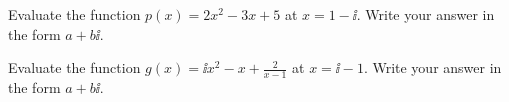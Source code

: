 \begin{exercise}
	Evaluate the function $p(x)=2x^2-3x+5$ at $x=1-\ii$.
	Write your answer in the form $a+b\ii$.
\end{exercise}

\vfill
\begin{center} \hfill
\end{center}

\begin{exercise}
	Evaluate the function $g(x)=\ii x^2-x+\frac{2}{x-1}$ at $x=\ii-1$.
	Write your answer in the form $a+b\ii$.
\end{exercise}

\vfill
\begin{center} \hfill
\end{center}